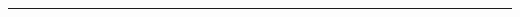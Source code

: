 \documentclass{scrartcl}
\begin{document}
  \setlength\parindent{0ex}

  \begin{adjustwidth}{0.6cm}{0.6cm}
    \begin{center}
      \LARGE{\textsc\TheMainTitle}
      
      \vspace*{0.3cm}
      
      \large{\textsc\TheSubTitle}
    \end{center}
    
    \vspace*{0.9cm}
    
    \BackDescription

    \vspace*{0.1cm}

    \noindent\rule[0.1pt]{\linewidth}{0.25pt}

    \vspace*{0.25cm}

    \AuthorBio %
  \end{adjustwidth}

\end{document}
